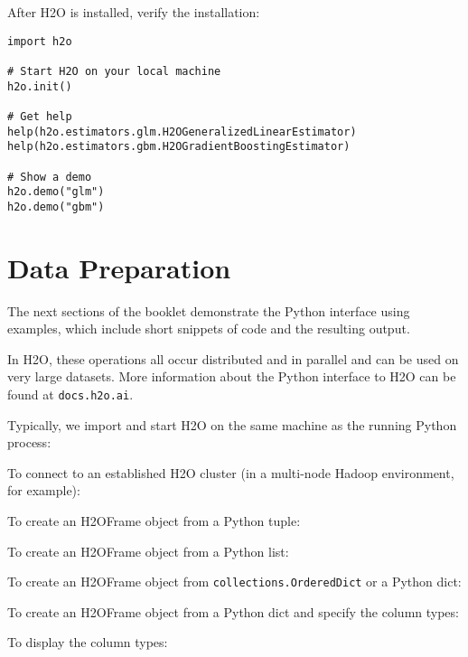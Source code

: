 {After H2O is installed, verify the installation:

\begin{lstlisting}[style=pythoncode]
import h2o

# Start H2O on your local machine
h2o.init()

# Get help
help(h2o.estimators.glm.H2OGeneralizedLinearEstimator)
help(h2o.estimators.gbm.H2OGradientBoostingEstimator)

# Show a demo
h2o.demo("glm")
h2o.demo("gbm")
\end{lstlisting}


\section{Data Preparation}
The next sections of the booklet demonstrate the Python interface using examples, which include  short snippets of code and the
resulting output.  

In H2O, these operations all occur distributed and in
parallel and can be used on very large datasets.  More information about the
Python interface to H2O can be found at {\texttt{docs.h2o.ai}}.

Typically, we import and start H2O on the same machine as the running Python process:


To connect to an established H2O cluster (in a multi-node Hadoop environment, for example):


To create an H2OFrame object from a Python tuple:


To create an H2OFrame object from a Python list:


To create an H2OFrame object from \texttt{collections.OrderedDict} or a Python dict:


To create an H2OFrame object from a Python dict and specify the column types:


To display the column types:


}
